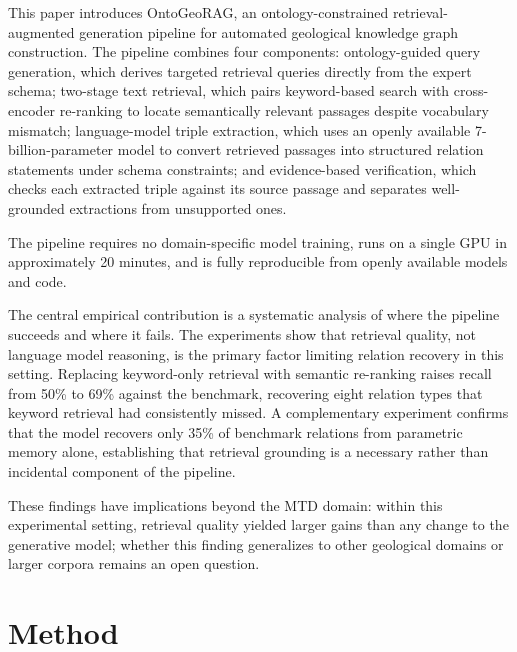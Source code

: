 \documentclass[10pt]{article}
\newcommand{\method}{OntoGeoRAG}
\begin{document}
This paper introduces \method{}, an ontology-constrained
retrieval-augmented generation pipeline for automated geological
knowledge graph construction. The pipeline combines four components:
ontology-guided query generation, which derives targeted retrieval
queries directly from the expert schema; two-stage text retrieval,
which pairs keyword-based search with cross-encoder re-ranking to
locate semantically relevant passages despite vocabulary mismatch;
language-model triple extraction, which uses an openly available
7-billion-parameter model to convert retrieved passages into
structured relation statements under schema constraints; and
evidence-based verification, which checks each extracted triple
against its source passage and separates well-grounded extractions
from unsupported ones.

The pipeline requires no domain-specific model training, runs on a
single GPU in approximately 20 minutes, and is fully reproducible
from openly available models and code.

The central empirical contribution is a systematic analysis of where
the pipeline succeeds and where it fails. The experiments show that
retrieval quality, not language model reasoning, is the primary
factor limiting relation recovery in this setting. Replacing
keyword-only retrieval with semantic re-ranking raises recall from
50\% to 69\% against the benchmark, recovering eight relation types
that keyword retrieval had consistently missed. A complementary
experiment confirms that the model recovers only 35\% of benchmark
relations from parametric memory alone, establishing that retrieval
grounding is a necessary rather than incidental component of the
pipeline.

These findings have implications beyond the MTD domain: within this experimental setting, retrieval quality
yielded larger gains than any change to the generative
model; whether this finding generalizes to other geological
domains or larger corpora remains an open question.







\section{Method}
\label{sec:method}
\end{document}
